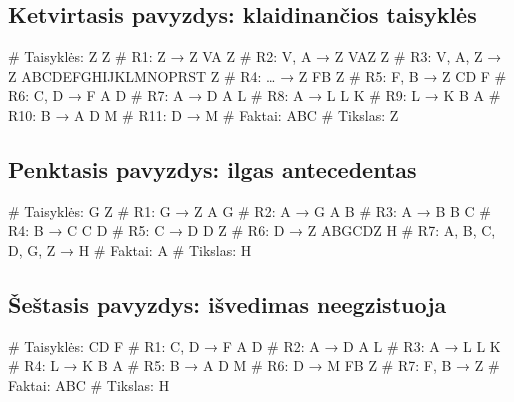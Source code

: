 \subsection{Ketvirtasis pavyzdys: klaidinančios taisyklės}

\begin{pythonaienv}[bc]
# Taisyklės:
Z Z                                     # R1:  Z → Z
VA Z                                    # R2:  V, A → Z
VAZ Z                                   # R3:  V, A, Z → Z
ABCDEFGHIJKLMNOPRST Z                   # R4:  … → Z
FB Z                                    # R5:  F, B → Z
CD F                                    # R6:  C, D → F
A D                                     # R7:  A → D
A L                                     # R8:  A → L
L K                                     # R9:  L → K
B A                                     # R10: B → A
D M                                     # R11: D → M
# Faktai:
ABC
# Tikslas:
Z
\end{pythonaienv}

\subsection{Penktasis pavyzdys: ilgas antecedentas}

\begin{pythonaienv}[bc]
# Taisyklės:
G Z                                     # R1: G → Z
A G                                     # R2: A → G
A B                                     # R3: A → B
B C                                     # R4: B → C
C D                                     # R5: C → D
D Z                                     # R6: D → Z
ABGCDZ H                                # R7: A, B, C, D, G, Z → H
# Faktai:
A
# Tikslas:
H
\end{pythonaienv}

\subsection{Šeštasis pavyzdys: išvedimas neegzistuoja}

\begin{pythonaienv}[bc]
# Taisyklės:
CD F                                    # R1: C, D → F
A D                                     # R2: A → D
A L                                     # R3: A → L
L K                                     # R4: L → K
B A                                     # R5: B → A
D M                                     # R6: D → M
FB Z                                    # R7: F, B → Z
# Faktai:
ABC
# Tikslas:
H
\end{pythonaienv}

